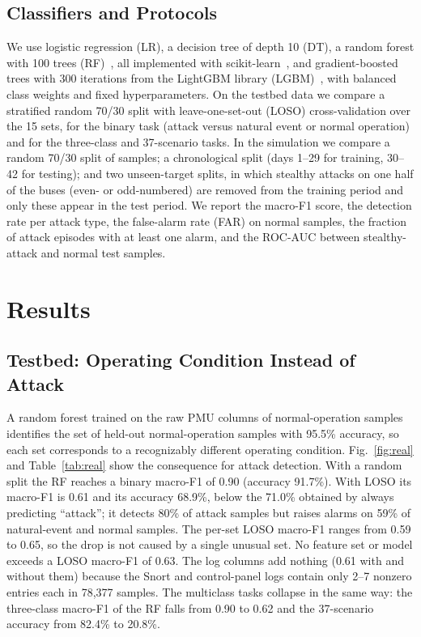 \documentclass[conference]{IEEEtran}
\begin{document}
\subsection{Classifiers and Protocols}
We use logistic regression (LR), a decision tree of depth 10 (DT), a random forest with 100 trees (RF)~\cite{breiman2001rf}, all implemented with scikit-learn~\cite{pedregosa2011sklearn}, and gradient-boosted trees with 300 iterations from the LightGBM library (LGBM)~\cite{ke2017lightgbm}, with balanced class weights and fixed hyperparameters. On the testbed data we compare a stratified random 70/30 split with leave-one-set-out (LOSO) cross-validation over the 15 sets, for the binary task (attack versus natural event or normal operation) and for the three-class and 37-scenario tasks. In the simulation we compare a random 70/30 split of samples; a chronological split (days 1--29 for training, 30--42 for testing); and two unseen-target splits, in which stealthy attacks on one half of the buses (even- or odd-numbered) are removed from the training period and only these appear in the test period. We report the macro-F1 score, the detection rate per attack type, the false-alarm rate (FAR) on normal samples, the fraction of attack episodes with at least one alarm, and the ROC-AUC between stealthy-attack and normal test samples.

\section{Results}
\subsection{Testbed: Operating Condition Instead of Attack}
A random forest trained on the raw PMU columns of normal-operation samples identifies the set of held-out normal-operation samples with 95.5\% accuracy, so each set corresponds to a recognizably different operating condition. Fig.~\ref{fig:real} and Table~\ref{tab:real} show the consequence for attack detection. With a random split the RF reaches a binary macro-F1 of 0.90 (accuracy 91.7\%). With LOSO its macro-F1 is 0.61 and its accuracy 68.9\%, below the 71.0\% obtained by always predicting ``attack''; it detects 80\% of attack samples but raises alarms on 59\% of natural-event and normal samples. The per-set LOSO macro-F1 ranges from 0.59 to 0.65, so the drop is not caused by a single unusual set. No feature set or model exceeds a LOSO macro-F1 of 0.63. The log columns add nothing (0.61 with and without them) because the Snort and control-panel logs contain only 2--7 nonzero entries each in 78{,}377 samples. The multiclass tasks collapse in the same way: the three-class macro-F1 of the RF falls from 0.90 to 0.62 and the 37-scenario accuracy from 82.4\% to 20.8\%.
\end{document}
